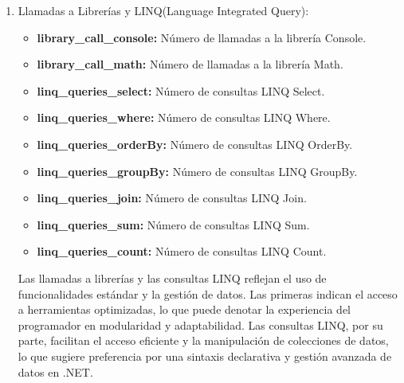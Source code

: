 \begin{enumerate}
    Al analizar modificadores como readonly, volatile o async, se obtiene información sobre cómo el código maneja la concurrencia, la inmutabilidad y la asincronía. Estos modificadores se emplean para identificar similitudes en la lógica y el flujo de ejecución. Modificadores como virtual y override indican una arquitectura orientada a objetos, lo que permite comparar el grado de extensibilidad y personalización en distintos fragmentos de código. Además, la presencia de unsafe y extern sugiere interacción con recursos de bajo nivel o externos, lo que proporciona información sobre las dependencias.

    \item Llamadas a Librerías y LINQ(Language Integrated Query):
    \begin{itemize}
        \item {\bf library\_call\_console:} Número de llamadas a la librería Console.
        \item {\bf library\_call\_math:} Número de llamadas a la librería Math.
        \item {\bf linq\_queries\_select:} Número de consultas LINQ Select.
        \item {\bf linq\_queries\_where:} Número de consultas LINQ Where.
        \item {\bf linq\_queries\_orderBy:} Número de consultas LINQ OrderBy.
        \item {\bf linq\_queries\_groupBy:} Número de consultas LINQ GroupBy.
        \item {\bf linq\_queries\_join:} Número de consultas LINQ Join.
        \item {\bf linq\_queries\_sum:} Número de consultas LINQ Sum.
        \item {\bf linq\_queries\_count:} Número de consultas LINQ Count.
    \end{itemize}
    
    Las llamadas a librerías y las consultas LINQ reflejan el uso de funcionalidades estándar y la gestión de datos. Las primeras indican el acceso a herramientas optimizadas, lo que puede denotar la experiencia del programador en modularidad y adaptabilidad. Las consultas LINQ, por su parte, facilitan el acceso eficiente y la manipulación de colecciones de datos, lo que sugiere preferencia por una sintaxis declarativa y gestión avanzada de datos en .NET.


\end{enumerate}
